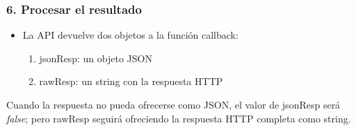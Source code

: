 \begin{frame}
\frametitle{6. Procesar el resultado}

\begin{itemize}
  \item La API devuelve dos objetos a la función callback:
  \begin{enumerate}
    \item jsonResp: un objeto JSON
    \item rawResp: un string con la respuesta HTTP
  \end{enumerate}
\end{itemize}

Cuando la respuesta no pueda ofrecerse como JSON, el valor de jsonResp será \emph{false}; pero rawResp seguirá ofreciendo la respuesta HTTP completa como string.


\end{frame}



